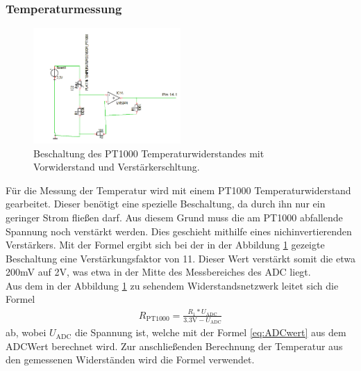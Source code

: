 \documentclass[12pt,a4paper,titlepage,headinclude,bibtotoc]{scrartcl}
\begin{document}
\subsubsection{Temperaturmessung}
\begin{figure}[!h]
\centering
\includegraphics[width=0.5\textwidth]{Fotos/PT1000Schaltung.png}
\caption{Beschaltung des PT1000 Temperaturwiderstandes mit Vorwiderstand und Verstärkerschltung.}
\label{fig:PT1000Schaltung}
\end{figure}
Für die Messung der Temperatur wird mit einem PT1000 Temperaturwiderstand gearbeitet.
Dieser benötigt eine spezielle Beschaltung, da durch ihn nur ein geringer Strom fließen darf.
Aus diesem Grund muss die am PT1000 abfallende Spannung noch verstärkt werden.
Dies geschieht mithilfe eines nichinvertierenden Verstärkers. %
Mit der Formel %
ergibt sich bei der in der Abbildung \ref{fig:PT1000Schaltung} gezeigte Beschaltung eine Verstärkungsfaktor von 11.
Dieser Wert verstärkt somit die etwa 200\si{\milli\volt} auf 2\si{\volt}, was etwa in der Mitte des Messbereiches des ADC liegt.\\
Aus dem in der Abbildung \ref{fig:PT1000Schaltung} zu sehendem Widerstandsnetzwerk leitet sich die Formel
\begin{align}
	R_\text{PT1000}=\frac{R_1*U_\text{ADC}}{3.3\si{\volt}-U_\text{ADC}}
\end{align}
ab, wobei $U_\text{ADC}$ die Spannung ist, welche mit der Formel \eqref{eq:ADCwert} aus dem ADCWert berechnet wird.
Zur anschließenden Berechnung der Temperatur aus den gemessenen Widerständen wird die Formel %
verwendet.
\end{document}
